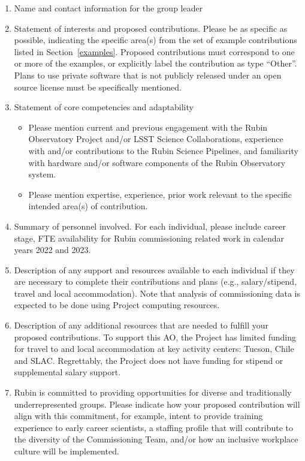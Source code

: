 \documentclass[SE,authoryear,toc]{lsstdoc}
\begin{document}
\begin{enumerate}
\item Name and contact information for the group leader

\item Statement of interests and proposed contributions. Please be as specific as possible, indicating the specific area(s) from the set of example contributions listed in Section~\ref{examples}. Proposed contributions must correspond to one or more of the examples, or explicitly label the contribution as type ``Other''. Plans to use private software that is not publicly released under an open source license must be specifically mentioned.

\item Statement of core competencies and adaptability
\begin{itemize}
\item Please mention current and previous engagement with the Rubin Observatory Project and/or LSST Science Collaborations, experience with and/or contributions to the Rubin Science Pipelines, and familiarity with hardware and/or software components of the Rubin Observatory system.
\item Please mention expertise, experience, prior work relevant to the specific intended area(s) of contribution.
\end{itemize}

\item Summary of personnel involved. For each individual, please include career stage, FTE availability for Rubin commissioning related work in calendar years 2022 and 2023. 

\item Description of any support and resources available to each individual if they are necessary to complete their contributions and plans (e.g., salary/stipend, travel and local accommodation). Note that analysis of commissioning data is expected to be done using Project computing resources.

\item Description of any additional resources that are needed to fulfill your proposed contributions. To support this AO, the Project has limited funding for travel to and local accommodation at key activity centers: Tucson, Chile and SLAC.  Regrettably, the Project does not have funding for stipend or supplemental salary support.

\item Rubin is committed to providing opportunities for diverse and traditionally underrepresented groups. Please indicate how your proposed contribution will align with this commitment, for example, intent to provide training experience to early career scientists, a staffing profile that will contribute to the diversity of the Commissioning Team, and/or how an inclusive workplace culture will be implemented. 
\end{enumerate}
\end{document}
